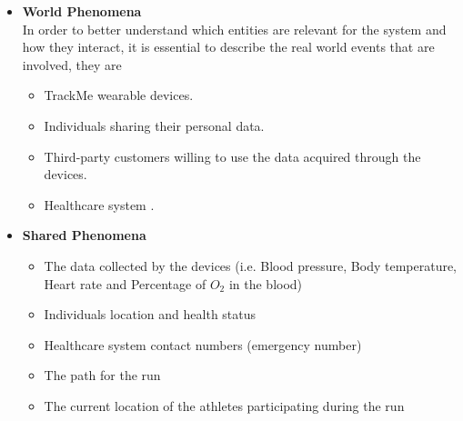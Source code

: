 \documentclass[12pt]{article}
\begin{document}
\begin{itemize}
\item \textbf{World Phenomena}
\\
In order to better understand which entities are relevant for the system and how they interact, it is essential to describe the real world events that are involved, they are
\begin{itemize}
\item{} TrackMe wearable devices.
\item{} Individuals sharing their personal data.
\item{} Third-party customers willing to use the data acquired through the devices.
\item{} Healthcare system .
\end{itemize}

\item \textbf{Shared Phenomena}
\\

\begin{itemize}
\item{} The data collected by the devices (i.e. Blood pressure, Body temperature, Heart rate and Percentage of $O_2$ in the blood)
\item{} Individuals location and health status
\item{} Healthcare system contact numbers (emergency number)
\item{} The path for the run
\item{} The current location of the athletes participating during the run
\end{itemize}
\end{itemize}
\end{document}
